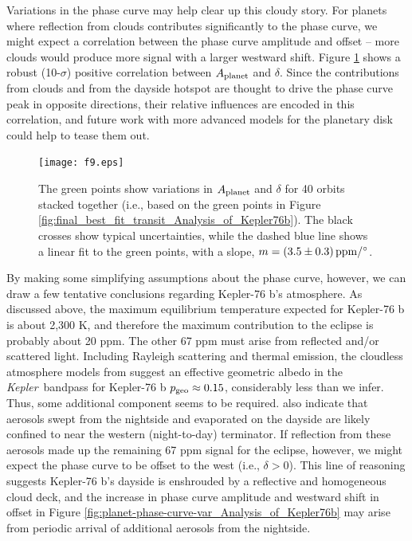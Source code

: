 \documentclass[manuscript]{aastex62}
\newcommand{\kepler}{{\it Kepler}}
\begin{document}
Variations in the phase curve may help clear up this cloudy story. For planets where reflection from clouds contributes significantly to the phase curve, we might expect a correlation between the phase curve amplitude and offset -- more clouds would produce more signal with a larger westward shift. Figure \ref{fig:Aplanet-delta-var_Analysis_of_Kepler76b} shows a robust (10-$\sigma$) positive correlation between $A_{\rm planet}$ and $\delta$. Since the contributions from clouds and from the dayside hotspot are thought to drive the phase curve peak in opposite directions, their relative influences are encoded in this correlation, and future work with more advanced models for the planetary disk \citep[e.g.,][]{2017ascl.soft11019L} could help to tease them out.

\begin{figure}
\texttt{[image: f9.eps]}
\caption{The green points show variations in $A_{\rm planet}$ and $\delta$ for 40 orbits stacked together (i.e., based on the green points in Figure \ref{fig:final_best_fit_transit_Analysis_of_Kepler76b}). The black crosses show typical uncertainties, while the dashed blue line shows a linear fit to the green points, with a slope, $m = \left( 3.5 \pm 0.3 \right) {\rm ppm/^\circ}$. \label{fig:Aplanet-delta-var_Analysis_of_Kepler76b}}
\end{figure}

By making some simplifying assumptions about the phase curve, however, we can draw a few tentative conclusions regarding Kepler-76 b's atmosphere. As discussed above, the maximum equilibrium temperature expected for Kepler-76 b is about 2,300 K, and therefore the maximum contribution to the eclipse is probably about 20 ppm. The other 67 ppm must arise from reflected and/or scattered light. Including Rayleigh scattering and thermal emission, the cloudless atmosphere models from \citet{2016ApJ...828...22P} suggest an effective geometric albedo in the \kepler\ bandpass for Kepler-76 b $p_{\rm geo} \approx 0.15$, considerably less than we infer. Thus, some additional component seems to be required. \citet{2016ApJ...828...22P} also indicate that aerosols swept from the nightside and evaporated on the dayside are likely confined to near the western (night-to-day) terminator. If reflection from these aerosols made up the remaining 67 ppm signal for the eclipse, however, we might expect the phase curve to be offset to the west (i.e., $\delta > 0$). This line of reasoning suggests Kepler-76 b's dayside is enshrouded by a reflective and homogeneous cloud deck, and the increase in phase curve amplitude and westward shift in offset in Figure \ref{fig:planet-phase-curve-var_Analysis_of_Kepler76b} may arise from periodic arrival of additional aerosols from the nightside.
\end{document}
